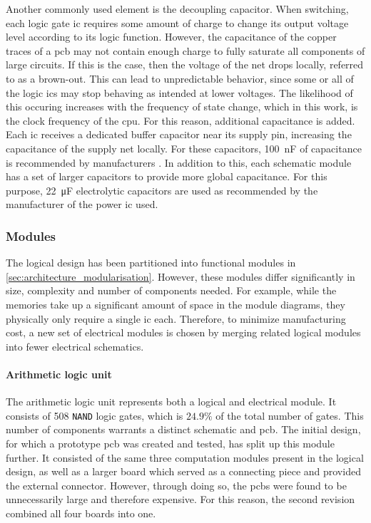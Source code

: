 Another commonly used element is the decoupling capacitor. When switching, each logic gate \ac{ic} requires some amount of charge to change its output voltage level according to its logic function. However, the capacitance of the copper traces of a \ac{pcb} may not contain enough charge to fully saturate all components of large circuits. If this is the case, then the voltage of the net drops locally, referred to as a brown-out. This can lead to unpredictable behavior, since some or all of the logic \acp{ic} may stop behaving as intended at lower voltages. The likelihood of this occuring increases with the frequency of state change, which in this work, is the clock frequency of the \ac{cpu}. For this reason, additional capacitance is added. Each \ac{ic} receives a dedicated buffer capacitor near its supply pin, increasing the capacitance of the supply net locally. For these capacitors, \SI{100}{\nano\farad} of capacitance is recommended by manufacturers \cite{ti_sn74hc00,microchip_atmega2560}. In addition to this, each schematic module has a set of larger capacitors to provide more global capacitance. For this purpose, \SI{22}{\micro\farad} electrolytic capacitors are used as recommended by the manufacturer of the power \ac{ic} used\cite{tracopower_tsr3}.


\subsubsection{Modules}

The logical design has been partitioned into functional modules in \autoref{sec:architecture_modularisation}. However, these modules differ significantly in size, complexity and number of components needed. For example, while the memories take up a significant amount of space in the module diagrams, they physically only require a single \ac{ic} each. Therefore, to minimize manufacturing cost, a new set of electrical modules is chosen by merging related logical modules into fewer electrical schematics.

\paragraph*{Arithmetic logic unit}

The arithmetic logic unit represents both a logical and electrical module. It consists of 508 \texttt{NAND} logic gates, which is $24.9\%$ of the total number of gates. This number of components warrants a distinct schematic and \ac{pcb}. The initial design, for which a prototype \ac{pcb} was created and tested, has split up this module further. It consisted of the same three computation modules present in the logical design, as well as a larger board which served as a connecting piece and provided the external connector. However, through doing so, the \acp{pcb} were found to be unnecessarily large and therefore expensive. For this reason, the second revision combined all four boards into one.

